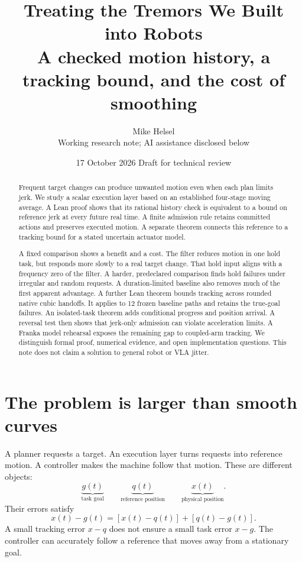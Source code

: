 \documentclass[11pt,letterpaper]{article}
\title{\vspace{-1.5em}\textbf{Treating the Tremors We Built into Robots}\\[.4em]
\large A checked motion history, a tracking bound, and the cost of smoothing}
\author{Mike Helsel\\[-.2em]\small Working research note; AI assistance disclosed below}
\date{17 October 2026 \quad Draft for technical review}
\begin{document}
\maketitle
\vspace{-1em}
\begin{abstract}
Frequent target changes can produce unwanted motion even when each plan limits jerk. We study a scalar execution layer based on an established four-stage moving average. A Lean proof shows that its rational history check is equivalent to a bound on reference jerk at every future real time. A finite admission rule retains committed actions and preserves executed motion. A separate theorem connects this reference to a tracking bound for a stated uncertain actuator model.

A fixed comparison shows a benefit and a cost. The filter reduces motion in one hold task, but responds more slowly to a real target change. That hold input aligns with a frequency zero of the filter. A harder, predeclared comparison finds hold failures under irregular and random requests. A duration-limited baseline also removes much of the first apparent advantage. A further Lean theorem bounds tracking across rounded native cubic handoffs. It applies to 12 frozen baseline paths and retains the true-goal failures. An isolated-task theorem adds conditional progress and position arrival. A reversal test then shows that jerk-only admission can violate acceleration limits. A Franka model rehearsal exposes the remaining gap to coupled-arm tracking. We distinguish formal proof, numerical evidence, and open implementation questions. This note does not claim a solution to general robot or VLA jitter.
\end{abstract}
\section{The problem is larger than smooth curves}
A planner requests a target. An execution layer turns requests into reference motion. A controller makes the machine follow that motion. These are different objects:
\[
\underbrace{g(t)}_{\text{task goal}}\qquad
\underbrace{q(t)}_{\text{reference position}}\qquad
\underbrace{x(t)}_{\text{physical position}}.
\]
Their errors satisfy
\begin{equation}\label{split}
x(t)-g(t)=[x(t)-q(t)]+[q(t)-g(t)].
\end{equation}
A small tracking error $x-q$ does not ensure a small task error $x-g$. The controller can accurately follow a reference that moves away from a stationary goal.
\end{document}
